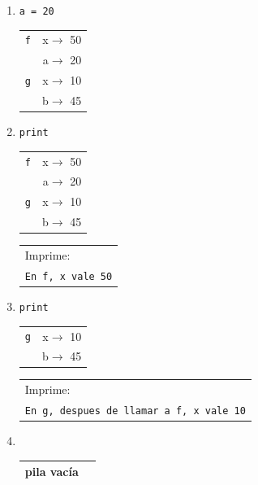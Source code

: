 \begin{enumerate}
\item  \verb|a = 20| \hspace{1.5cm}
	\begin{tabular}{r|r|}
	\hline
	\verb|f|& x$\rightarrow$ 50 \\
	             & a$\rightarrow$ 20 \\
	\hline
	\hline
	\verb|g|& x$\rightarrow$ 10 \\
	             & b$\rightarrow$ 45 \\
	\hline
	\end{tabular}

\item  \verb|print | \hspace{1.5cm}
	\begin{tabular}{r|r|}
	\hline
	\verb|f|& x$\rightarrow$ 50 \\
	             & a$\rightarrow$ 20 \\
	\hline
	\hline
	\verb|g|& x$\rightarrow$ 10 \\
	             & b$\rightarrow$ 45 \\
	\hline
	\end{tabular}
	\hspace{1cm}
	\begin{tabular}{l}
	Imprime: \\
	{\tt En f, x vale 50}
	\end{tabular}

\item  \verb|print | \hspace{1.5cm}
	\begin{tabular}{r|r|}
	\hline
	\verb|g|& x$\rightarrow$ 10 \\
	             & b$\rightarrow$ 45 \\
	\hline
	\end{tabular}
	\hspace{1cm}
	\begin{tabular}{l}
	Imprime: \\
	{\tt En g, despues de llamar a f, x vale 10}
	\end{tabular}

\item  \verb|      | \hspace{1.5cm}
	\begin{tabular}{r|r|}
	\hline
	pila vacía\\
	\hline
	\end{tabular}

\end{enumerate}

